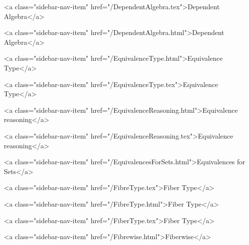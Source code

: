       
        
          <a class="sidebar-nav-item" href="/DependentAlgebra.tex">Dependent Algebra</a>
        
      
    
      
        
          <a class="sidebar-nav-item" href="/DependentAlgebra.html">Dependent Algebra</a>
        
      
    
      
        
          <a class="sidebar-nav-item" href="/EquivalenceType.html">Equivalence Type</a>
        
      
    
      
        
          <a class="sidebar-nav-item" href="/EquivalenceType.tex">Equivalence Type</a>
        
      
    
      
        
          <a class="sidebar-nav-item" href="/EquivalenceReasoning.html">Equivalence reasoning</a>
        
      
    
      
        
          <a class="sidebar-nav-item" href="/EquivalenceReasoning.tex">Equivalence reasoning</a>
        
      
    
      
        
          <a class="sidebar-nav-item" href="/EquivalencesForSets.html">Equivalences for Sets</a>
        
      
    
      
        
          <a class="sidebar-nav-item" href="/FibreType.tex">Fiber Type</a>
        
      
    
      
        
          <a class="sidebar-nav-item" href="/FibreType.html">Fiber Type</a>
        
      
    
      
        
          <a class="sidebar-nav-item" href="/FiberType.tex">Fiber Type</a>
        
      
    
      
        
          <a class="sidebar-nav-item" href="/Fibrewise.html">Fiberwise</a>
        
